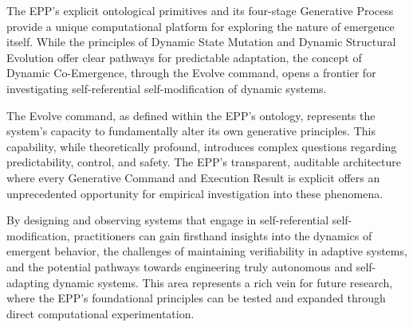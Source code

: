 The EPP's explicit ontological primitives and its four-stage Generative Process provide a  unique computational platform for exploring the nature of emergence itself. While the  principles of Dynamic State Mutation and Dynamic Structural Evolution offer clear pathways for  predictable adaptation, the concept of Dynamic Co-Emergence, through the Evolve command, opens a frontier for investigating self-referential self-modification of dynamic systems.

The Evolve command, as defined within the EPP's ontology, represents the system's capacity to  fundamentally alter its own generative principles. This capability, while theoretically profound, introduces complex questions regarding predictability, control, and safety. The EPP's transparent, auditable  architecture where every Generative Command and Execution Result is explicit offers an unprecedented opportunity for empirical investigation into these phenomena.

By designing and observing systems that engage in self-referential self-modification, practitioners can gain firsthand insights into the dynamics of emergent behavior, the challenges of maintaining verifiability in adaptive systems, and the potential pathways towards engineering truly autonomous and self-adapting dynamic systems. This area represents a rich vein for future research, where the EPP's foundational principles can be tested and expanded through direct computational experimentation.

\newpage

